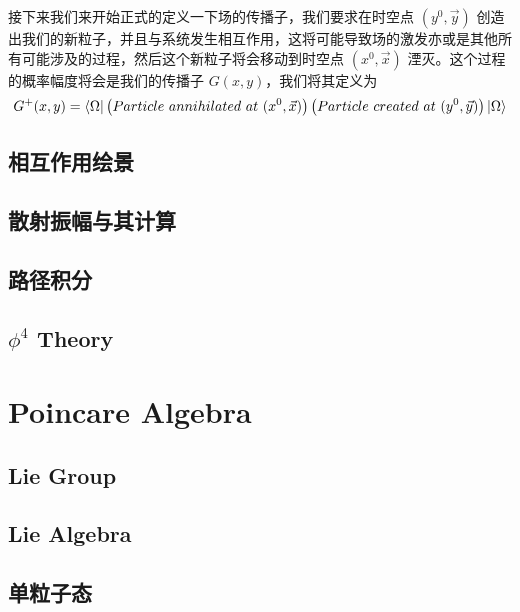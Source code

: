 \documentclass{article}
\begin{document}
接下来我们来开始正式的定义一下场的传播子，我们要求在时空点 $(y^0,\vec{y})$ 创造出我们的新粒子，并且与系统发生相互作用，这将可能导致场的激发亦或是其他所有可能涉及的过程，然后这个新粒子将会移动到时空点 $(x^0,\vec{x})$ 湮灭。这个过程的概率幅度将会是我们的传播子 $G(x,y)$，我们将其定义为 
\begin{equation*}
    G^{+}(x,y) = \bra{\Omega}\left( Particle\ annihilated\ at\ (x^0,\vec{x})\right)\left(Particle\ created\ at\ (y^0,\vec{y})\right)\ket{\Omega}
\end{equation*}




\subsection{相互作用绘景}







\subsection{散射振幅与其计算}


\subsection{路径积分}



\subsection{$\phi^4$ Theory}


\section{Poincare Algebra}


\subsection{Lie Group}



\subsection{Lie Algebra}



\subsection{单粒子态}
\end{document}
